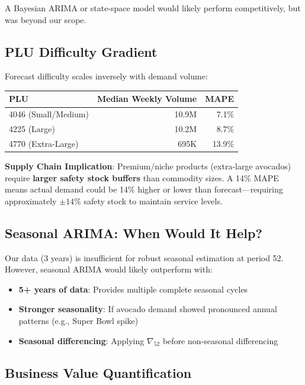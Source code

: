 \documentclass[12pt]{article}
\begin{document}
A Bayesian ARIMA or state-space model would likely perform competitively, but was beyond our scope.

\subsection{PLU Difficulty Gradient}

Forecast difficulty scales inversely with demand volume:

\begin{center}
\begin{tabular}{lrr}
\toprule
\textbf{PLU} & \textbf{Median Weekly Volume} & \textbf{MAPE} \\
\midrule
4046 (Small/Medium) & 10.9M & 7.1\% \\
4225 (Large) & 10.2M & 8.7\% \\
4770 (Extra-Large) & 695K & 13.9\% \\
\bottomrule
\end{tabular}
\end{center}

\textbf{Supply Chain Implication}: Premium/niche products (extra-large avocados) require \textbf{larger safety stock buffers} than commodity sizes. A 14\% MAPE means actual demand could be 14\% higher or lower than forecast---requiring approximately $\pm 14\%$ safety stock to maintain service levels.

\subsection{Seasonal ARIMA: When Would It Help?}

Our data (3 years) is insufficient for robust seasonal estimation at period 52. However, seasonal ARIMA would likely outperform with:

\begin{itemize}
    \item \textbf{5+ years of data}: Provides multiple complete seasonal cycles
    \item \textbf{Stronger seasonality}: If avocado demand showed pronounced annual patterns (e.g., Super Bowl spike)
    \item \textbf{Seasonal differencing}: Applying $\nabla_{52}$ before non-seasonal differencing
\end{itemize}

\subsection{Business Value Quantification}
\end{document}
